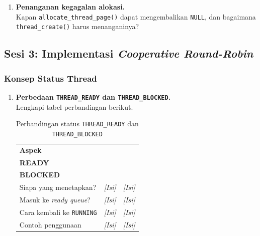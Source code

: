\begin{enumerate}
	      \begin{lstlisting}[language=c, caption={Implementasi \texttt{thread\_create()} oleh mahasiswa}]
tid_t thread_create(const char *name, int priority,
                    thread_func *function, void *aux) {

    /* Tulis implementasi Anda di sini */

}
    \end{lstlisting}

	\item \textbf{Penanganan kegagalan alokasi.}\\
	      Kapan \texttt{allocate\_thread\_page()} dapat mengembalikan
	      \texttt{NULL}, dan bagaimana \texttt{thread\_create()} harus
	      menanganinya?

\end{enumerate}

\subsection{Sesi 3: Implementasi \textit{Cooperative Round-Robin}}

\subsubsection{Konsep Status Thread}

\begin{enumerate}

	\item \textbf{Perbedaan \texttt{THREAD\_READY} dan
		      \texttt{THREAD\_BLOCKED}.}\\
	      Lengkapi tabel perbandingan berikut.

	      \begin{table}[!ht]
		      \caption{Perbandingan status \texttt{THREAD\_READY} dan \texttt{THREAD\_BLOCKED}}
		      \label{tab:h04-thread-status}
		      \small
		      \begin{tabularx}{\linewidth}{|X|X|X|}
			      \hline
			      \textbf{Aspek} &
			      \makecell[l]{\textbf{THREAD\_}\\\textbf{READY}} &
			      \makecell[l]{\textbf{THREAD\_}\\\textbf{BLOCKED}} \\
			      \hline
			      Siapa yang menetapkan? & \textit{[Isi]} & \textit{[Isi]} \\
			      \hline
			      Masuk ke \textit{ready queue}? & \textit{[Isi]} & \textit{[Isi]} \\
			      \hline
			      Cara kembali ke \texttt{RUNNING} & \textit{[Isi]} & \textit{[Isi]} \\
			      \hline
			      Contoh penggunaan & \textit{[Isi]} & \textit{[Isi]} \\
			      \hline
		      \end{tabularx}
	      \end{table}

\end{enumerate}

